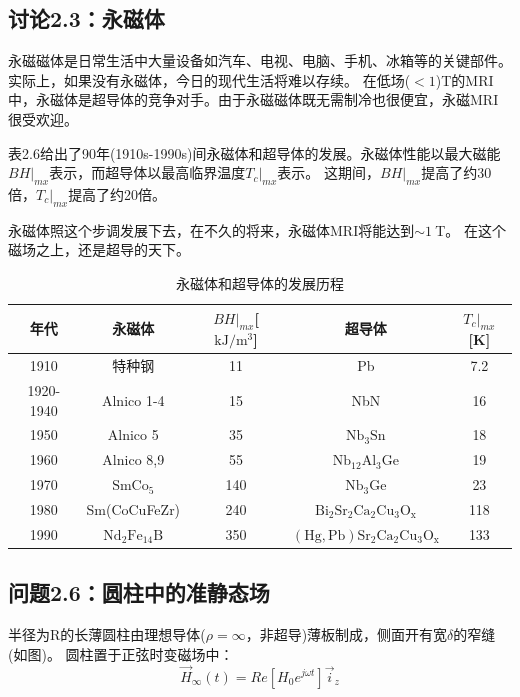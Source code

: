 \subsection{讨论2.3：永磁体}
永磁磁体是日常生活中大量设备如汽车、电视、电脑、手机、冰箱等的关键部件。实际上，如果没有永磁体，今日的现代生活将难以存续。
在低场($<1$)T的MRI中，永磁体是超导体的竞争对手。由于永磁磁体既无需制冷也很便宜，永磁MRI很受欢迎。

表2.6给出了90年(1910s-1990s)间永磁体和超导体的发展。永磁体性能以最大磁能$BH|_{mx}$表示，而超导体以最高临界温度$T_c|_{mx}$表示。
这期间，$BH|_{mx}$提高了约30倍，$T_c|_{mx}$提高了约20倍。

永磁体照这个步调发展下去，在不久的将来，永磁体MRI将能达到$\sim 1\ $T。
在这个磁场之上，还是超导的天下。

\begin{table}[htbp]
\centering
\caption{永磁体和超导体的发展历程}
\label{磁体和超导体的发展}
\begin{tabular}{|c|c|c|c|c|}
\hline
年代        & 永磁体 & $BH|_{mx}$[$\mathrm{kJ/m^3}$] & 超导体 & $T_c|_{mx}$[K]   \\ \hline
1910      &  特种钢   & 11       &  Pb   & 7.2 \\ \hline
1920-1940 &  Alnico 1-4   & 15       &   NbN  & 16  \\ \hline
1950      &   Alnico 5  & 35       &    $\mathrm{Nb_3 Sn}$ & 18  \\ \hline
1960      &   Alnico 8,9  & 55       &   $\mathrm{Nb_{12}Al_3 Ge}$  &   19  \\ \hline
1970      &   $\mathrm{SmCo_5} $  & 140      &  $\mathrm{Nb_3Ge}$   & 23    \\ \hline
1980      &   Sm(CoCuFeZr)  & 240      &  $\mathrm{Bi_2 Sr_2 Ca_2 Cu_3 O_x}$   & 118 \\ \hline
1990      &  $\mathrm{Nd_2Fe_{14}B}$   & 350      & $\mathrm{(Hg, Pb) Sr_2 Ca_2 Cu_3 O_x}$    & 133 \\ \hline
\end{tabular}
\end{table}



\subsection{问题2.6：圆柱中的准静态场}
半径为R的长薄圆柱由理想导体($\rho=\infty$，非超导)薄板制成，侧面开有宽$\delta$的窄缝(如图)。
圆柱置于正弦时变磁场中：
\begin{equation}
\vec{H}_\infty(t)=Re[H_0 e^{j\omega t}] \vec{i}_z
\end{equation}

